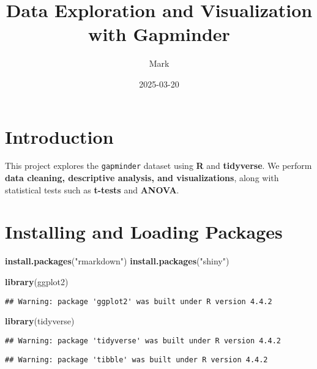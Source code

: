 \documentclass[
]{article}
\title{Data Exploration and Visualization with Gapminder}
\author{Mark}
\date{2025-03-20}
\newenvironment{Shaded}{\begin{snugshade}}{\end{snugshade}}
\newcommand{\FunctionTok}[1]{\textcolor[rgb]{0.13,0.29,0.53}{\textbf{#1}}}
\newcommand{\NormalTok}[1]{#1}
\newcommand{\StringTok}[1]{\textcolor[rgb]{0.31,0.60,0.02}{#1}}
\begin{document}
\maketitle

\section{Introduction}\label{introduction}

This project explores the \texttt{gapminder} dataset using \textbf{R}
and \textbf{tidyverse}. We perform \textbf{data cleaning, descriptive
analysis, and visualizations}, along with statistical tests such as
\textbf{t-tests} and \textbf{ANOVA}.

\section{Installing and Loading
Packages}\label{installing-and-loading-packages}

\begin{Shaded}
\begin{Highlighting}[]
\FunctionTok{install.packages}\NormalTok{(}\StringTok{"rmarkdown"}\NormalTok{)}
\FunctionTok{install.packages}\NormalTok{(}\StringTok{"shiny"}\NormalTok{)}
\end{Highlighting}
\end{Shaded}

\begin{Shaded}
\begin{Highlighting}[]
\FunctionTok{library}\NormalTok{(ggplot2)}
\end{Highlighting}
\end{Shaded}

\begin{verbatim}
## Warning: package 'ggplot2' was built under R version 4.4.2
\end{verbatim}

\begin{Shaded}
\begin{Highlighting}[]
\FunctionTok{library}\NormalTok{(tidyverse)}
\end{Highlighting}
\end{Shaded}

\begin{verbatim}
## Warning: package 'tidyverse' was built under R version 4.4.2
\end{verbatim}

\begin{verbatim}
## Warning: package 'tibble' was built under R version 4.4.2
\end{verbatim}
\end{document}
